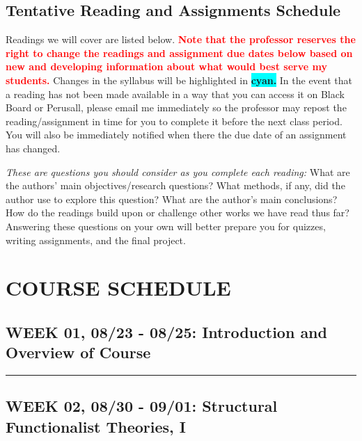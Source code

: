 \documentclass[11pt,]{article}
\begin{document}
\hypertarget{tentative-reading-and-assignments-schedule}{%
\subsection{Tentative Reading and Assignments
Schedule}\label{tentative-reading-and-assignments-schedule}}

Readings we will cover are listed below.
\textcolor{red}{\bf{Note that the professor reserves the right to change the readings and assignment due dates below based on new and developing information about what would best serve my students.}}
Changes in the syllabus will be highlighted in
\colorbox{Cyan}{\bf{cyan.}} In the event that a reading has not been
made available in a way that you can access it on Black Board or
Perusall, please email me immediately so the professor may repost the
reading/assignment in time for you to complete it before the next class
period. You will also be immediately notified when there the due date of
an assignment has changed.

\emph{These are questions you should consider as you complete each
reading:} What are the authors' main objectives/research questions? What
methods, if any, did the author use to explore this question? What are
the author's main conclusions? How do the readings build upon or
challenge other works we have read thus far? Answering these questions
on your own will better prepare you for quizzes, writing assignments,
and the final project.

\hypertarget{course-schedule}{%
\section{COURSE SCHEDULE}\label{course-schedule}}

\hypertarget{week-01-0823---0825-introduction-and-overview-of-course}{%
\subsection{WEEK 01, 08/23 - 08/25: Introduction and Overview of
Course}\label{week-01-0823---0825-introduction-and-overview-of-course}}

\bigbreak
\hrule

\hypertarget{week-02-0830---0901-structural-functionalist-theories-i}{%
\subsection{WEEK 02, 08/30 - 09/01: Structural Functionalist Theories,
I}\label{week-02-0830---0901-structural-functionalist-theories-i}}
\end{document}
